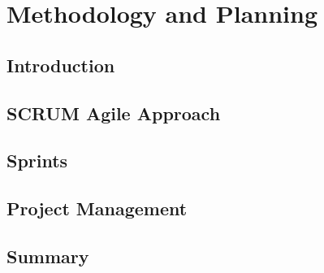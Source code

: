 \chapter{Methodology and Planning}
\label{chap:methodology_planning}

\section{Introduction}

\section{SCRUM Agile Approach}

\section{Sprints}

\section{Project Management}

\section{Summary}
